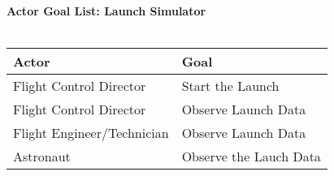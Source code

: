 \documentclass[letterpaper]{article}
\begin{document}
\noindent
\textbf{Actor Goal List: Launch Simulator}\\\\
\vspace{4ex}
\begin{tabular}{|p{5cm}|p{5cm}|}\hline
\textbf{Actor} & \textbf{Goal}\\\hline
Flight Control Director & Start the Launch\\\hline
Flight Control Director & Observe Launch Data\\\hline
Flight Engineer/Technician & Observe Launch Data\\\hline
Astronaut & Observe the Lauch Data\\\hline
\end{tabular}
\end{document}
